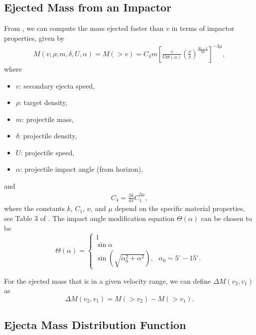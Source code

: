 \documentclass{hitec}
\begin{document}
\subsection{Ejected Mass from an Impactor}
From \cite{housen2011ejecta}, we can compute the mass ejected faster than $v$ in terms of impactor properties, given by
\begin{eqnarray}\label{eq:HH11_mass-ejected1}
M(v; \rho; m, \delta, U, \alpha) = M(>v) = C_4 m\left[\frac{v}{U\Theta(\alpha)}\left(\frac{\rho}{\delta}\right)^{\frac{3\nu-1}{3\mu}}\right]^{-3\mu},
\end{eqnarray}
where
\begin{itemize}
	\item $v$: secondary ejecta speed,
	\item $\rho$: target density,
	\item $m$: projectile mass,
	\item $\delta$: projectile density,
	\item $U$: projectile speed,
	\item $\alpha$: projectile impact angle (from horizon),
\end{itemize}
and
\begin{eqnarray}
C_4 = \frac{3k}{4\pi}C_1^{3\mu},
\end{eqnarray}
where the constants $k$, $C_1$, $\nu$, and $\mu$ depend on the specific material properties, see Table 3 of \cite{housen2011ejecta}. The impact angle modification equation $\Theta(\alpha)$ can be chosen to be
\begin{equation}
\Theta(\alpha) = \begin{cases}
1\\
\sin\alpha\\
\sin(\sqrt{\alpha_0^2 + \alpha^2}),\text{  } \alpha_0 \sim 5^\circ-15^\circ.
\end{cases}
\end{equation}

For the ejected mass that is in a given velocity range, we can define $\Delta M(v_2, v_1)$ as
\begin{equation}\label{eq:delta_M}
\Delta M(v_2, v_1) = M(>v_2) - M(>v_1).
\end{equation}

\subsection{Ejecta Mass Distribution Function}
\end{document}
